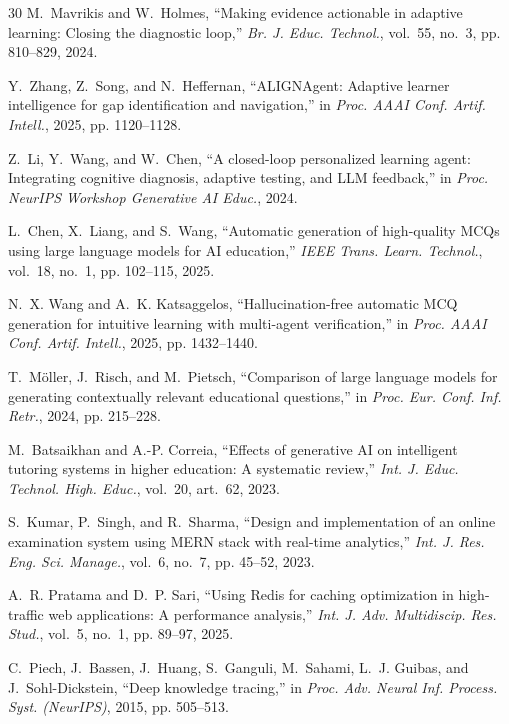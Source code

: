 \documentclass[journal]{IEEEtran}
\begin{document}
\begin{thebibliography}{30}
M.~Mavrikis and W.~Holmes, ``Making evidence actionable in adaptive learning: Closing the diagnostic loop,'' \emph{Br. J. Educ. Technol.}, vol.~55, no.~3, pp. 810--829, 2024.

Y.~Zhang, Z.~Song, and N.~Heffernan, ``ALIGNAgent: Adaptive learner intelligence for gap identification and navigation,'' in \emph{Proc. AAAI Conf. Artif. Intell.}, 2025, pp. 1120--1128.

Z.~Li, Y.~Wang, and W.~Chen, ``A closed-loop personalized learning agent: Integrating cognitive diagnosis, adaptive testing, and LLM feedback,'' in \emph{Proc. NeurIPS Workshop Generative AI Educ.}, 2024.

L.~Chen, X.~Liang, and S.~Wang, ``Automatic generation of high-quality MCQs using large language models for AI education,'' \emph{IEEE Trans. Learn. Technol.}, vol.~18, no.~1, pp. 102--115, 2025.

N.~X. Wang and A.~K. Katsaggelos, ``Hallucination-free automatic MCQ generation for intuitive learning with multi-agent verification,'' in \emph{Proc. AAAI Conf. Artif. Intell.}, 2025, pp. 1432--1440.

T.~M\"{o}ller, J.~Risch, and M.~Pietsch, ``Comparison of large language models for generating contextually relevant educational questions,'' in \emph{Proc. Eur. Conf. Inf. Retr.}, 2024, pp. 215--228.

M.~Batsaikhan and A.-P. Correia, ``Effects of generative AI on intelligent tutoring systems in higher education: A systematic review,'' \emph{Int. J. Educ. Technol. High. Educ.}, vol.~20, art.~62, 2023.

S.~Kumar, P.~Singh, and R.~Sharma, ``Design and implementation of an online examination system using MERN stack with real-time analytics,'' \emph{Int. J. Res. Eng. Sci. Manage.}, vol.~6, no.~7, pp. 45--52, 2023.

A.~R. Pratama and D.~P. Sari, ``Using Redis for caching optimization in high-traffic web applications: A performance analysis,'' \emph{Int. J. Adv. Multidiscip. Res. Stud.}, vol.~5, no.~1, pp. 89--97, 2025.

C.~Piech, J.~Bassen, J.~Huang, S.~Ganguli, M.~Sahami, L.~J. Guibas, and J.~Sohl-Dickstein, ``Deep knowledge tracing,'' in \emph{Proc. Adv. Neural Inf. Process. Syst. (NeurIPS)}, 2015, pp. 505--513.


\end{thebibliography}
\end{document}
